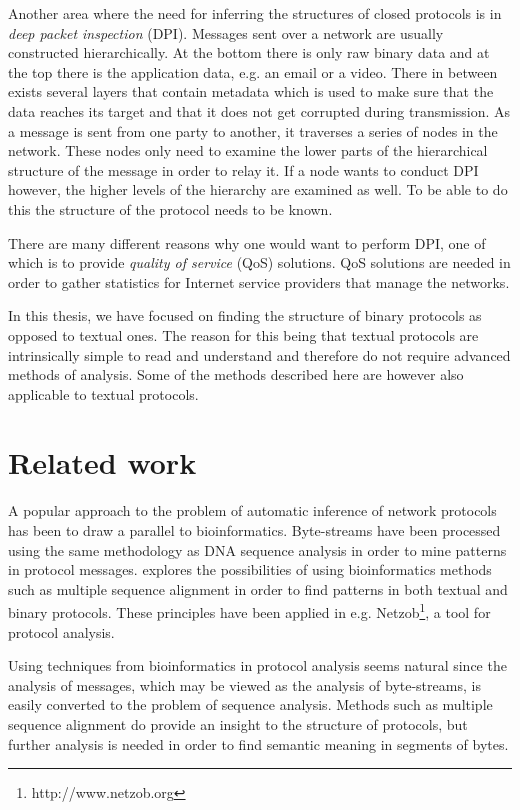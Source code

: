 \documentclass[a4paper]{report}
\begin{document}
Another area where the need for inferring the structures of closed protocols is
in \emph{deep packet inspection} (DPI). Messages sent over a network are
usually constructed hierarchically. At the bottom there is only raw binary data
and at the top there is the application data, e.g. an email or a video. There
in between exists several layers that contain metadata which is used to make
sure that the data reaches its target and that it does not get corrupted during
transmission. As a message is sent from one party to another, it traverses a
series of nodes in the network. These nodes only need to examine the lower
parts of the hierarchical structure of the message in order to relay it. If a
node wants to conduct DPI however, the higher levels of the hierarchy are
examined as well. To be able to do this the structure of the protocol needs to
be known.

There are many different reasons why one would want to perform DPI, one of
which is to provide \emph{quality of service} (QoS) solutions. QoS solutions
are needed in order to gather statistics for Internet service providers that
manage the networks.

In this thesis, we have focused on finding the structure of binary protocols as
opposed to textual ones. The reason for this being that textual protocols are
intrinsically simple to read and understand and therefore do not require
advanced methods of analysis. Some of the methods described here are however
also applicable to textual protocols.

\section{Related work}
A popular approach to the problem of automatic inference of network protocols
has been to draw a parallel to bioinformatics. Byte-streams have been
processed using the same methodology as DNA sequence analysis in order
to mine patterns in protocol messages. \citet{beddoe05} explores the
possibilities of using bioinformatics methods such as multiple sequence
alignment in order to find patterns in both textual and binary protocols. These
principles have been applied in e.g. Netzob\footnote{http://www.netzob.org}, a
tool for protocol analysis.

Using techniques from bioinformatics in protocol analysis seems natural since
the analysis of messages, which may be viewed as the analysis of byte-streams,
is easily converted to the problem of sequence analysis. Methods such as
multiple sequence alignment do provide an insight to the structure of
protocols, but further analysis is needed in order to find semantic meaning in
segments of bytes.
\end{document}
